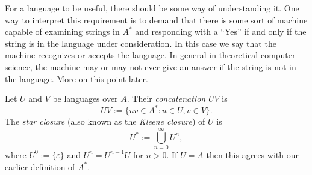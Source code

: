 \begin{ap} For a language to be useful, there should be some way of
    understanding it. One way to interpret this requirement is to
    demand that there is some sort of machine capable of examining
    strings in $A^*$ and responding with a ``Yes'' if and only if the
    string is in the language under consideration. In this case we say
    that the machine recognizes or accepts the language. In general in
    theoretical computer science, the machine may or may not ever give
    an answer if the string is not in the language. More on this point
    later.
\end{ap}

\begin{defns} Let $U$ and $V$ be languages over $A$. Their
    \emph{concatenation} $UV$ is \[UV := \{uv \in A^* : u \in U, v \in
    V\}.\] The \emph{star closure} (also known as the \emph{Kleene
    closure}) of $U$ is \[ U^* := \bigcup_{n=0}^\infty U^n,\] where
    $U^0 := \{\varepsilon\}$ and $U^n = U^{n-1}U$ for $n>0$. If $U=A$
    then this agrees with our earlier definition of $A^*$.
\end{defns}

